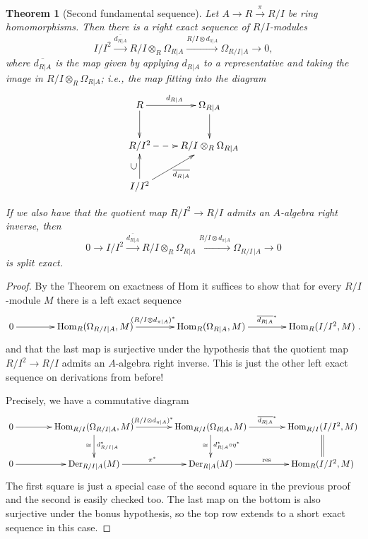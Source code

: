 \documentclass{amsart}[12pt]
\def\Der{\operatorname{Der}}
\newcommand{\Hom}{\mathrm{Hom}}
\numberwithin{equation}{section}
\theoremstyle{plain} %
\newtheorem{thm}[equation]{Theorem}
\theoremstyle{definition}
\theoremstyle{remark}
\newcommand{\xra}[1]{\xrightarrow{#1}}
\begin{document}
\begin{thm}[Second fundamental sequence]
Let $A\to R \xra{\pi} R/I$ be ring homomorphisms. Then there is a right exact sequence of $R/I$-modules
\[ I/I^2 \xra{\overline{d_{R|A}} } R/I \otimes_R \Omega_{R|A} \xra{R/I \otimes d_{\pi|A}} \Omega_{R/I \,|A} \to 0 ,\]
where $\overline{d_{R|A}}$ is the map given by applying $d_{R|A}$ to a representative and taking the image in $R/I \otimes_R \Omega_{R|A}$; i.e., the map fitting into the diagram
 \[ \xymatrix{ R \ar[r]^{d_{R|A}} \ar[d] & \Omega_{R|A} \ar[d]\\
 R/I^2 \ar@{-->}[r] &  R/I \otimes_R \Omega_{R|A} \\
 I/I^2 \ar[u]^-{\rotatebox{90}{$\subset$}} \ar[ur]_{\overline{d_{R|A}}} & }\]

If we also have that the quotient map $R/I^2\to R/I$ admits an $A$-algebra right inverse, then 
\[ 0 \to I/I^2 \xra{\overline{d_{R|A}} } R/I \otimes_R \Omega_{R|A} \xra{R/I \otimes d_{\pi|A}} \Omega_{R/I \,|A} \to 0 \]
is split exact.
\end{thm}
\begin{proof}
By the Theorem on exactness of Hom it suffices to show that for every $R/I$-module $M$ there is a left exact sequence
\[ \xymatrix@C=4em{ 0 \ar[r] & \Hom_{R}(\Omega_{R/I | A},M) \ar[r]^{(R/I \otimes d_{\pi|A})^*} & \Hom_{R}(\Omega_{R|A},M) \ar[r]^-{\overline{d_{R|A}}^*} & \Hom_{R}(I/I^2,M)}. \]
and that the last map is surjective under the hypothesis that  the quotient map $R/I^2\to R/I$ admits an $A$-algebra right inverse.
This is just the other left exact sequence on derivations from before! 

Precisely, we have a commutative diagram
\[ \xymatrix@C=4em{ 0 \ar[r] & \Hom_{R/I}(\Omega_{R/I | A},M) \ar[r]^{(R/I \otimes d_{\pi|A})^*} \ar[d]^{d_{R/I |A}^*}_{\cong} & \Hom_{R/I}(\Omega_{R|A},M) \ar[r]^-{\overline{d_{R|A}}^*} \ar[d]^{d_{R|A}^* \circ \eta^*}_{\cong} & \Hom_{R/I}(I/I^2,M) \ar@{=}[d]  \\
0\ar[r] & \Der_{R/I | A}(M) \ar[r]^{\mathrm{\pi^*}} & \Der_{R|A}(M) \ar[r]^{\mathrm{res}} & \Hom_R(I/I^2,M)
} \]
The first square is just a special case of the second square in the previous proof and the second is easily checked too. The last map on the bottom is also surjective under the bonus hypothesis, so the top row extends to a short exact sequence in this case.
\end{proof}
\end{document}
